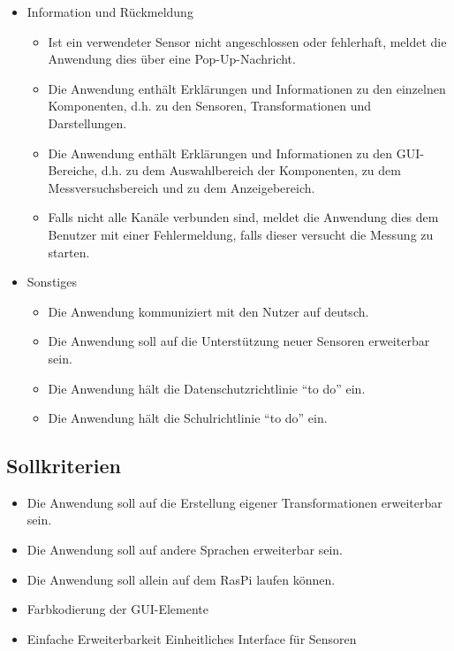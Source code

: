 \documentclass[parskip=full]{scrartcl}
\begin{document}
\begin{itemize}
\begin{itemize}
\end{itemize}

\item Information und Rückmeldung
\begin{itemize}

\item Ist ein verwendeter Sensor nicht angeschlossen oder fehlerhaft, meldet die Anwendung dies über eine Pop-Up-Nachricht.
\item Die Anwendung enthält Erklärungen und Informationen zu den einzelnen Komponenten, d.h. zu den Sensoren, Transformationen und Darstellungen.
\item Die Anwendung enthält Erklärungen und Informationen zu den GUI-Bereiche, d.h. zu dem Auswahlbereich der Komponenten, zu dem Messversuchsbereich und zu dem Anzeigebereich.
\item Falls nicht alle Kanäle verbunden sind, meldet die Anwendung dies dem Benutzer mit einer Fehlermeldung, falls dieser versucht die Messung zu starten. 

\end{itemize}

\item Sonstiges
\begin{itemize}

\item Die Anwendung kommuniziert mit den Nutzer auf deutsch.
\item Die Anwendung soll auf die Unterstützung neuer Sensoren erweiterbar sein.
\item Die Anwendung hält die Datenschutzrichtlinie "`to do"' ein.
\item Die Anwendung hält die Schulrichtlinie "`to do"' ein.

\end{itemize}

 \end{itemize}

\subsection{Sollkriterien}

\begin{itemize}

\item Die Anwendung soll auf die Erstellung eigener Transformationen erweiterbar sein.
\item Die Anwendung soll auf andere Sprachen erweiterbar sein.
\item Die Anwendung soll allein auf dem \gls{RasPi} laufen können.
\item Farbkodierung der GUI-Elemente
\item Einfache Erweiterbarkeit
\subitem Einheitliches Interface für Sensoren


 \end{itemize}
\end{document}
